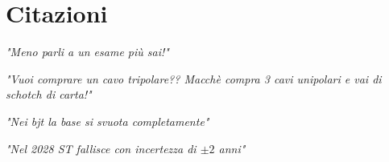 \chapter{Citazioni}

\raggedright
{\itshape "Meno parli a un esame più sai!"}
\raggedleft

\vspace{5mm}

\raggedleft
{\itshape "Vuoi comprare un cavo tripolare?? Macchè compra 3 cavi unipolari e vai di schotch di carta!"}
\raggedright

\vspace{5mm}

\raggedright
{\itshape "Nei bjt la base si svuota completamente"}
\raggedleft

\vspace{5mm}

\raggedleft
{\itshape "Nel 2028 ST fallisce con incertezza di $\pm 2$ anni"}
\raggedright
